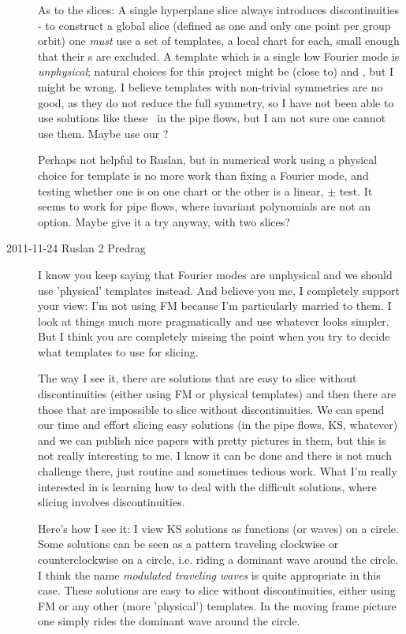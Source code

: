 \begin{description}
As to the slices: A single hyperplane slice always
introduces discontinuities - to construct a global slice (defined as one
and only one point per group orbit) one \emph{must} use a set of
templates, a local chart for each, small enough that their \sset s are
excluded. A template which is a single low Fourier mode is
\emph{unphysical}; natural choices for this project might be (close to)
 and , but I might be wrong. I believe templates with
non-trivial symmetries are no good, as they do not reduce the full
symmetry, so I have not been able to use solutions like these \eqva\ in
the pipe flows, but I am not sure one cannot use them. Maybe use our
?

Perhaps not helpful to Ruslan, but in numerical work using a physical
choice for template is no more work than fixing a Fourier mode, and
testing whether one is on one chart or the other is a linear, $\pm$ test.
It seems to work for pipe flows, where invariant polynomials are not an
option. Maybe give it a try anyway, with two slices?

\item[2011-11-24 Ruslan 2 Predrag] I know you keep saying that Fourier modes are unphysical and we should use 'physical' templates instead.  And believe you me, I completely support your view: I'm not using FM because I'm particularly married to them.  I look at things much more pragmatically and use whatever looks simpler.  But I think you are completely missing the point when you try to decide what templates to use for slicing.

    The way I see it, there are solutions that are easy to slice without discontinuities (either using FM or physical templates) and then there are those that are impossible to slice without discontinuities.  We can spend our time and effort slicing easy solutions (in the pipe flows, KS, whatever) and we can publish nice papers with pretty pictures in them, but this is not really interesting to me.  I know it can be done and there is not much challenge there, just routine and sometimes tedious work.  What I'm really interested in is learning how to deal with the difficult solutions, where slicing involves discontinuities.

    Here's how I see it: I view KS solutions as functions (or waves) on a circle.  Some solutions can be seen as a pattern traveling clockwise or counterclockwise on a circle, i.e. riding a dominant wave around the circle.  I think the name {\em modulated traveling waves} is quite appropriate in this case.  These solutions are easy to slice without discontinuities, either using FM or any other (more 'physical') templates.  In the moving frame picture one simply rides the dominant wave around the circle.


\end{description}
